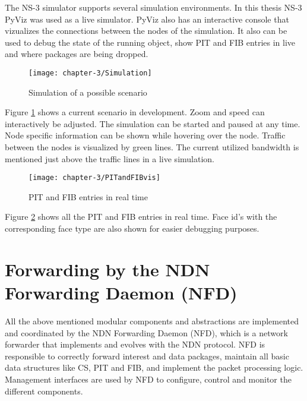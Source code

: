 The NS-3 simulator supports several simulation environments. In this thesis NS-3 PyViz was used as a live simulator. PyViz also has an interactive console that vizualizes the connections between the nodes of the simulation. It also can be used to debug the state of the running object, show PIT and FIB entries in live and where packages are being dropped.

\begin{figure}[H]
  \centering
  \texttt{[image: chapter-3/Simulation]}
  \caption{Simulation of a possible scenario}
  \label{fig:Simulation}
\end{figure}

Figure \ref{fig:Simulation} shows a current scenario in development. Zoom and speed can interactively be adjusted. The simulation can be started and paused at any time. Node specific information can be shown while hovering over the node. Traffic between the nodes is visualized by green lines. The current utilized bandwidth is mentioned just above the traffic lines in a live simulation.

\begin{figure}[H]
  \centering
  \texttt{[image: chapter-3/PITandFIBvis]}
  \caption{PIT and FIB entries in real time}
  \label{fig:PITandFIBvis}
\end{figure}

Figure \ref{fig:PITandFIBvis} shows all the PIT and FIB entries in real time. Face id's with the corresponding face type are also shown for easier debugging purposes.

\section{Forwarding by the NDN Forwarding Daemon (NFD)}

All the above mentioned modular components and abstractions are implemented and coordinated by the NDN Forwarding Daemon (NFD), which is a network forwarder that implements and evolves with the NDN protocol. NFD is responsible to correctly forward interest and data packages, maintain all basic data structures like CS, PIT and FIB, and implement the packet processing logic. Management interfaces are used by NFD to configure, control and monitor the different components.

\vspace{5mm} %



